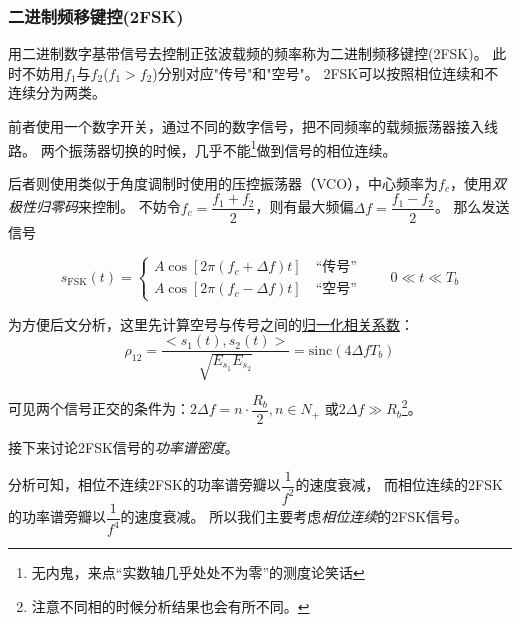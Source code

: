     \subsubsection{二进制频移键控(2FSK)}
    用二进制数字基带信号去控制正弦波载频的频率称为二进制频移键控(2FSK)。
    此时不妨用$f_1$与$f_2$($f_1>f_2$)分别对应"传号"和"空号"。
    2FSK可以按照相位连续和不连续分为两类。
    
    前者使用一个数字开关，通过不同的数字信号，把不同频率的载频振荡器接入线路。
    两个振荡器切换的时候，几乎不能\footnote{无内鬼，来点“实数轴几乎处处不为零”的测度论笑话}做到信号的相位连续。

    后者则使用类似于角度调制时使用的压控振荡器（VCO），中心频率为$f_c$，使用\emph{双极性归零码}来控制。
    不妨令$f_c=\dfrac{f_1+f_2}{2}$，则有最大频偏$\Delta f=\dfrac{f_1-f_2}{2}$。
    那么发送信号
    \vspace{-2ex}

    \begin{equation}
        s_{\text{FSK}}(t)=
        \begin{cases}
              A\cos[2\pi(f_c+\Delta f)t]\hspace{1em}\text{“传号”}\\
              A\cos[2\pi(f_c-\Delta f)t]\hspace{1em}\text{“空号”} 
        \end{cases}\hspace{2em}0\ll t\ll T_b
    \end{equation}

    为方便后文分析，这里先计算空号与传号之间的\hyperref[eq:Correlation-coefficient]{归一化相关系数}：
    \begin{equation}\label{eq:rhoof2fsk}
        \rho_{12}=\frac{<s_1(t),s_2(t)>}{\sqrt{E_{s_1}E_{s_2}}}=\text{sinc}(4\Delta fT_b)
    \end{equation}

    可见两个信号正交的条件为：$2\Delta f=n\cdot\dfrac{R_b}{2},n\in N_+$ 或$2\Delta f\gg R_b$\footnote{注意不同相的时候分析结果也会有所不同。}。

    接下来讨论2FSK信号的\emph{功率谱密度}。

    分析可知，相位不连续2FSK的功率谱旁瓣以$\dfrac{1}{f^2}$的速度衰减，
    而相位连续的2FSK的功率谱旁瓣以$\dfrac{1}{f^4}$的速度衰减。
    所以我们主要考虑\emph{相位连续}的2FSK信号。

